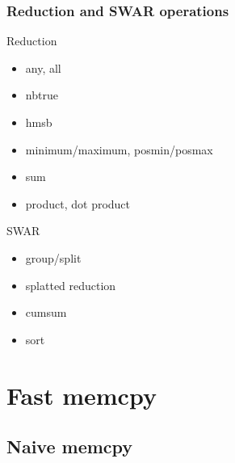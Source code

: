\documentclass{beamer}
\begin{document}
\begin{frame}
	\frametitle{Reduction and SWAR operations}
	
	\begin{multicols}{2}	
	
	Reduction
	\begin{itemize}
		\item any, all
		\item nbtrue
		\item hmsb
		\item minimum/maximum, posmin/posmax
		\item sum
		\item product, dot product
	\end{itemize}
	\columnbreak	
	
	SWAR
	\begin{itemize}
		\item group/split
		\item splatted reduction
		\item cumsum
		\item sort
	\end{itemize}
	
	\vfill
	\end{multicols}
	
\end{frame}

\section{Fast memcpy}

\subsection{Naive memcpy}

\begin{frame}
\end{frame}
\end{document}
